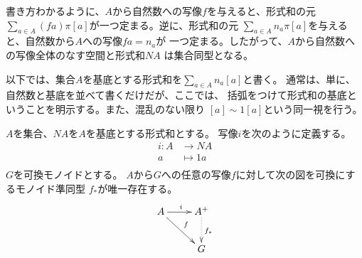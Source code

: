 	書き方わかるように、$A$から自然数への写像$f$を与えると、形式和の元
	$\sum_{a\in A}(fa)\pi[a]$が一つ定まる。逆に、形式和の元
	$\sum_{a\in A}n_a\pi[a]$を与えると、自然数から$A$への写像$fa=n_a$が
	一つ定まる。したがって、$A$から自然数への写像全体のなす空間と形式和$NA$
	は集合同型となる。
	
	以下では、集合$A$を基底とする形式和を$\sum_{a\in A}n_a[a]$と書く。
	通常は、単に、自然数と基底を並べて書くだけだが、ここでは、
	括弧をつけて形式和の基底ということを明示する。また、混乱のない限り
	$[a]\sim 1[a]$という同一視を行う。

	\begin{proposition}[形式和の普遍性]\label{prop:形式和の普遍性} %
		$A$を集合、$NA$を$A$を基底とする形式和とする。
		写像$i$を次のように定義する。
		\begin{equation}\begin{split} %
			i: A &\to NA \\
				a &\mapsto 1a \\
		\end{split}\end{equation} %
		$G$を可換モノイドとする。
		$A$から$G$への任意の写像$f$に対して次の図を可換にするモノイド準同型
		$f_*$が唯一存在する。
		\begin{equation}\xymatrix{
			A \ar[r]^i \ar[rd]^{f} & A^+ \ar@{.>}[d]^{f_*} \\
			& G \\
		}\end{equation}
	\end{proposition} %
